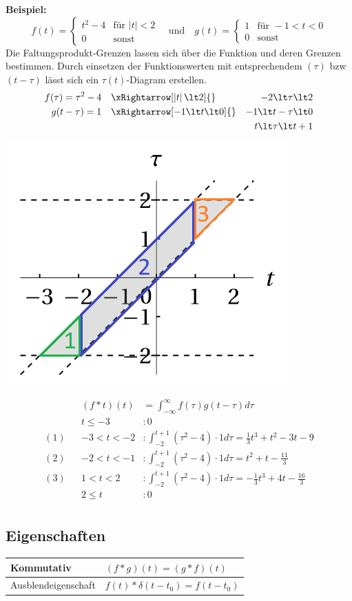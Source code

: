 \noindent\textbf{Beispiel:} 
\[
f(t) = \begin{cases}
	t^2 - 4 & \text{für } \left|t\right| \lt 2 \\
	0 & \text{sonst}
\end{cases}
\quad \text{und} \quad 
g(t) = \begin{cases}
	1 & \text{für } -1 \lt t \lt 0 \\
	0 & \text{sonst}
\end{cases}
\]
Die Faltungsprodukt-Grenzen lassen sich über die Funktion und deren Grenzen bestimmen. Durch einsetzen der Funktionswerten mit entsprechendem $(\tau)$ bzw $(t-\tau)$ lässt sich ein $\tau(t)$-Diagram erstellen.
\begin{align*}
	f(\tau) = \tau^2 - 4 &\quad \xRightarrow[\left|t\right| \lt 2]{}& -2 \lt \tau \lt 2\\
	g(t-\tau)= 1 &\quad \xRightarrow[-1 \lt t \lt 0]{}& -1 \lt t-\tau \lt 0\\
	&												  & t \lt \tau \lt t +1
\end{align*}
\begin{center}
	\includegraphics[width=0.4\columnwidth]{Images/faltprodukt}
\end{center}

\begin{align*}
	&& (f*t)(t) &= \int_{-\infty}^{\infty}f(\tau)g(t -\tau)d\tau \\
	&& t \leq -3       &: 0 \\
	(1) && -3 \lt t \lt -2 &: \int_{-2}^{t+1}(\tau^2 -4)\cdot 1d\tau = \frac{1}{3}t^3 + t^2 - 3t -9\\
	(2) && -2 \lt t \lt -1 &: \int_{-2}^{t+1}(\tau^2 -4)\cdot 1d\tau = t^2 + t - \frac{11}{3}\\
	(3) && 1 \lt t \lt 2   &: \int_{-2}^{t+1}(\tau^2 -4)\cdot 1d\tau = -\frac{1}{3}t^3 + 4t - \frac{16}{3}\\
	&& 2 \leq t &: 0 \\	
\end{align*}


\subsection{Eigenschaften}
	\begin{center}
		\begin{tabular}{l|l}
		Kommutativ & $(f * g)(t) = (g*f)(t)$ \\ \midrule
		Ausblendeigenschaft & $f(t)*\delta(t-t_0)=f(t-t_0)$
	\end{tabular}
\end{center}

